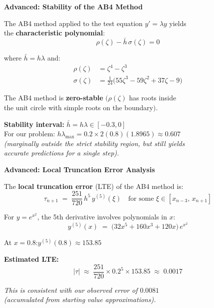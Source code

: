 \documentclass[12pt]{beamer}
\begin{document}
\begin{frame}{\textbf{Advanced: Stability of the AB4 Method}}
  \begin{center}
    \vfill
    The AB4 method applied to the test equation $y' = \lambda y$ yields\\[0.3em]
    the \textbf{characteristic polynomial}:
    \[
      \rho(\zeta) - \bar{h}\,\sigma(\zeta) = 0
    \]

    \vspace{0.5em}
    where $\bar{h} = h\lambda$ and:
    \begin{align*}
      \rho(\zeta) &= \zeta^4 - \zeta^3 \\
      \sigma(\zeta) &= \tfrac{1}{24}\bigl(55\zeta^3 - 59\zeta^2 + 37\zeta - 9\bigr)
    \end{align*}

    \vspace{1em}
    The AB4 method is \textbf{zero-stable} $(\rho(\zeta)$ has roots inside \\
    the unit circle with simple roots on the boundary$)$.

    \vspace{1em}
    \textbf{Stability interval:}\; $\bar{h} = h\lambda \in [-0.3, 0]$\\[0.3em]
    For our problem: $h\lambda_{\max} = 0.2 \times 2(0.8)(1.8965) \approx 0.607$\\[0.3em]
    \textit{(marginally outside the strict stability region, but still yields\\
    accurate predictions for a single step).}
    \vfill
  \end{center}
\end{frame}

\begin{frame}{\textbf{Advanced: Local Truncation Error Analysis}}
  \begin{center}
    \vfill
    The \textbf{local truncation error} (LTE) of the AB4 method is:
    \[
      \tau_{n+1} \;=\; \frac{251}{720}\,h^5\,y^{(5)}(\xi)
      \quad\text{for some } \xi \in [x_{n-3},\,x_{n+1}]
    \]

    \vspace{1em}
    For $y = e^{x^2}$, the 5th derivative involves polynomials in $x$:
    \[
      y^{(5)}(x) \;=\; \bigl(32x^5 + 160x^3 + 120x\bigr)\,e^{x^2}
    \]

    \vspace{0.8em}
    At $x = 0.8$:\quad $y^{(5)}(0.8) \approx 153.85$

    \vspace{1em}
    \textbf{Estimated LTE:}
    \[
      |\tau| \;\approx\; \frac{251}{720} \times 0.2^5 \times 153.85
             \;\approx\; 0.0017
    \]

    \vspace{0.8em}
    \textit{This is consistent with our observed error of $0.0081$\\
    (accumulated from starting value approximations).}
    \vfill
  \end{center}
\end{frame}
\end{document}
